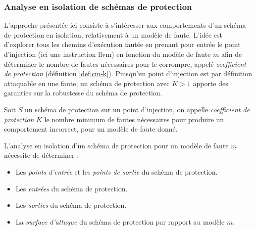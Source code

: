             \subsubsection{Analyse en isolation de schémas de protection}
            \label{sec:ooc}
            
                L'approche présentée ici consiste à s'intéresser aux comportements d'un schéma de protection en isolation, relativement à un modèle de faute.
                L'idée est d'explorer tous les chemins d'exécution fautée en prenant pour entrée le point d'injection (ici une instruction \gls{llvm}) en fonction du modèle de faute $m$ 
                afin de déterminer le nombre de fautes nécessaires pour le corrompre, appelé \textit{coefficient de protection} (définition \ref{def:cm-k}).
                Puisqu'un point d'injection est par définition attaquable en une faute, un schéma de protection avec $K > 1$ apporte des garanties sur la robustesse du schéma de protection.
                
                \begin{defi}
                    \label{def:cm-k}
                    Soit $S$ un schéma de protection sur un point d'injection, on appelle \textit{coefficient de protection} $K$ le nombre minimum de fautes nécessaires pour produire un comportement incorrect, pour un modèle de faute donné.
                \end{defi}     
                
                L'analyse en isolation d'un schéma de protection pour un modèle de faute $m$ nécessite de déterminer :
                \begin{itemize}
                    \item Les \textit{points d'entrée} et les \textit{points de sortie} du schéma de protection.
                    \item Les \textit{entrées} du schéma de protection.
                    \item Les \textit{sorties} du schéma de protection.
                    \item La \textit{surface d'attaque} du schéma de protection par rapport au modèle $m$.
                \end{itemize}

